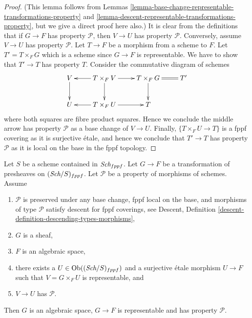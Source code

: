 \begin{proof}
(This lemma follows from
Lemmas \ref{lemma-base-change-representable-transformations-property} and
\ref{lemma-descent-representable-transformations-property},
but we give a direct proof here also.)
It is clear from the definitions that if $G \to F$ has property
$\mathcal{P}$, then $V \to U$ has property $\mathcal{P}$.
Conversely, assume $V \to U$ has property $\mathcal{P}$.
Let $T \to F$ be a morphism from a scheme to $F$.
Let $T' = T \times_F G$ which is a scheme since $G \to F$ is
representable. We have to show that $T' \to T$ has property $T$.
Consider the commutative diagram of schemes
$$
\xymatrix{
V \ar[d] & T \times_F V \ar[d] \ar[l] \ar[r] &
T \times_F G \ar[d] & \ar@{=}[l] T' \\
U & T \times_F U \ar[l] \ar[r] & T
}
$$
where both squares are fibre product squares. Hence we conclude
the middle arrow has property $\mathcal{P}$ as a base change
of $V \to U$. Finally, $\{T \times_F U \to T\}$ is a fppf covering
as it is surjective \'etale, and hence we conclude that
$T' \to T$ has property $\mathcal{P}$ as it is local on the
base in the fppf topology.
\end{proof}

\begin{lemma}
\label{lemma-morphism-sheaves-with-P-effective-descent-etale}
Let $S$ be a scheme contained in $\textit{Sch}_{fppf}$.
Let $G \to F$ be a transformation of presheaves on $(\textit{Sch}/S)_{fppf}$.
Let $\mathcal{P}$ be a property of morphisms of schemes.
Assume
\begin{enumerate}
\item $\mathcal{P}$ is preserved under any base change, fppf local on the
base, and morphisms of type $\mathcal{P}$ satisfy descent for fppf coverings,
see Descent, Definition \ref{descent-definition-descending-types-morphisms},
\item $G$ is a sheaf,
\item $F$ is an algebraic space,
\item there exists a $U \in \mathop{\rm Ob}\nolimits((\textit{Sch}/S)_{fppf})$
and a surjective \'etale morphism $U \to F$ such that
$V = G \times_F U$ is representable, and
\item $V \to U$ has $\mathcal{P}$.
\end{enumerate}
Then $G$ is an algebraic space, $G \to F$ is representable and has property
$\mathcal{P}$.
\end{lemma}

